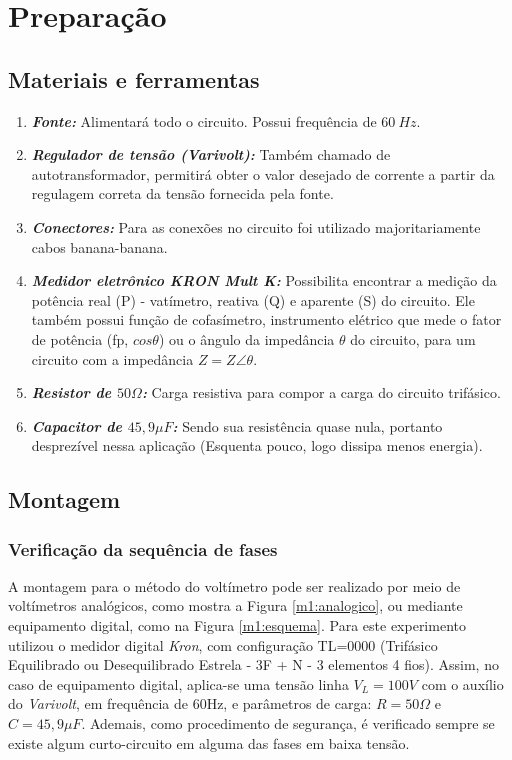\documentclass[a4paper,12pt,oneside,openany,table,xcdraw]{article}
\begin{document}
\section{Preparação}
\subsection{Materiais e ferramentas} %
\begin{enumerate}[1 -]
\item \emph{\textbf{Fonte:}}
Alimentará todo o circuito. Possui frequência de $60\ Hz$.

\item \emph{\textbf{Regulador de tensão (Varivolt):}}
Também chamado de autotransformador, permitirá obter o valor desejado de corrente a partir da regulagem correta da tensão fornecida pela fonte.

\item \emph{\textbf{Conectores:}}
Para as conexões no circuito foi utilizado majoritariamente cabos banana-banana.

\item \emph{\textbf{Medidor eletrônico KRON Mult K:}}
Possibilita encontrar a medição da potência real (P) - vatímetro, reativa (Q) e aparente (S) do circuito. Ele também possui função de cofasímetro, instrumento elétrico que mede o fator de potência (fp, $cos\theta$) ou o ângulo da impedância $\theta$ do circuito, para um circuito com a impedância $Z = Z\angle \theta$.

\item \emph{\textbf{Resistor de $50\Omega$:}}
Carga resistiva para compor a carga do circuito trifásico.

\item \emph{\textbf{Capacitor de $45,9\mu F$:}}
Sendo sua resistência quase nula, portanto desprezível nessa aplicação (Esquenta pouco, logo dissipa menos energia).
\end{enumerate}

\vspace{0.2cm}
\subsection{Montagem} %

\subsubsection{Verificação da sequência de fases}
A montagem para o método do voltímetro pode ser realizado por meio de voltímetros analógicos, como mostra a Figura \ref{m1:analogico}, ou mediante equipamento digital, como na Figura \ref{m1:esquema}. Para este experimento utilizou o medidor digital \emph{Kron}, com configuração TL=0000 (Trifásico Equilibrado ou Desequilibrado Estrela - 3F + N - 3 elementos 4 fios). 
Assim, no caso de equipamento digital, aplica-se uma tensão linha $V_L=100V$ com o auxílio do \emph{Varivolt}, em frequência de 60Hz, e parâmetros de carga: $R=50\Omega$ e $C=45,9 \mu F$. Ademais, como procedimento de segurança, é verificado sempre se existe algum curto-circuito em alguma das fases em baixa tensão.
\end{document}
